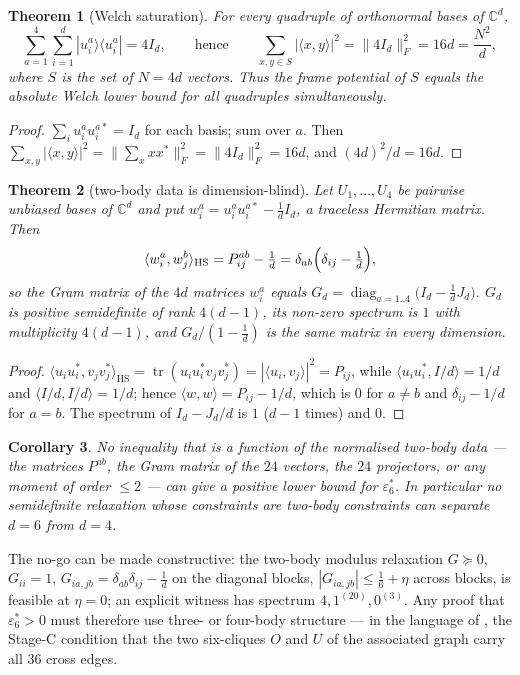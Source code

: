 \documentclass[11pt,a4paper]{article}
\newtheorem{theorem}{Theorem}[section]
\newtheorem{corollary}[theorem]{Corollary}
\theoremstyle{remark}
\newcommand{\C}{\mathbb{C}}
\newcommand{\HS}{\mathrm{HS}}
\newcommand{\eps}{\varepsilon}
\DeclareMathOperator{\tr}{tr}
\begin{document}
\begin{theorem}[Welch saturation]\label{thm:welch}
For \emph{every} quadruple of orthonormal bases of $\C^d$,
\[
\sum_{a=1}^{4}\sum_{i=1}^{d}|u^a_i\rangle\langle u^a_i|=4I_d,
\qquad\text{hence}\qquad
\sum_{x,y\in S}|\langle x,y\rangle|^2=\|4I_d\|_F^2=16d=\frac{N^2}{d},
\]
where $S$ is the set of $N=4d$ vectors.  Thus the frame potential of $S$ equals the absolute
Welch lower bound for all quadruples simultaneously.
\end{theorem}
\begin{proof}
$\sum_i u^a_i u^{a*}_i=I_d$ for each basis; sum over $a$.  Then
$\sum_{x,y}|\langle x,y\rangle|^2=\|\sum_x xx^*\|_F^2=\|4I_d\|_F^2=16d$, and $(4d)^2/d=16d$.
\end{proof}

\begin{theorem}[two-body data is dimension-blind]\label{thm:blind}
Let $U_1,\dots,U_4$ be pairwise unbiased bases of $\C^d$ and put
$w^a_i=u^a_iu^{a*}_i-\tfrac1d I_d$, a traceless Hermitian matrix.  Then
\[
\langle w^a_i,w^b_j\rangle_{\HS}=P^{ab}_{ij}-\tfrac1d
=\delta_{ab}\Bigl(\delta_{ij}-\tfrac1d\Bigr),
\]
so the Gram matrix of the $4d$ matrices $w^a_i$ equals
$G_d=\operatorname{diag}_{a=1..4}\bigl(I_d-\tfrac1dJ_d\bigr)$.  $G_d$ is positive semidefinite
of rank $4(d-1)$, its non-zero spectrum is $1$ with multiplicity $4(d-1)$, and
$G_d/(1-\tfrac1d)$ is the same matrix in every dimension.
\end{theorem}
\begin{proof}
$\langle u_iu_i^*,v_jv_j^*\rangle_{\HS}=\tr(u_iu_i^*v_jv_j^*)=|\langle u_i,v_j\rangle|^2=P_{ij}$,
while $\langle u_iu_i^*,I/d\rangle=1/d$ and $\langle I/d,I/d\rangle=1/d$; hence
$\langle w,w\rangle=P_{ij}-1/d$, which is $0$ for $a\ne b$ and $\delta_{ij}-1/d$ for $a=b$.
The spectrum of $I_d-J_d/d$ is $1$ ($d-1$ times) and $0$.
\end{proof}

\begin{corollary}\label{cor:nogo}
No inequality that is a function of the normalised two-body data --- the matrices $P^{ab}$,
the Gram matrix of the $24$ vectors, the $24$ projectors, or any moment of order $\le2$ ---
can give a positive lower bound for $\eps_6^*$.  In particular no semidefinite relaxation
whose constraints are two-body constraints can separate $d=6$ from $d=4$.
\end{corollary}

The no-go can be made constructive: the two-body modulus relaxation
$G\succeq0$, $G_{ii}=1$, $G_{ia,jb}=\delta_{ab}\delta_{ij}-\tfrac1d$ on the diagonal blocks,
$|G_{ia,jb}|\le\tfrac16+\eta$ across blocks, is feasible at $\eta=0$; an explicit witness has
spectrum $4,1^{(20)},0^{(3)}$.  Any proof that $\eps_6^*>0$ must therefore use three- or
four-body structure --- in the language of \cite{preprint}, the Stage-C condition that the two
six-cliques $O$ and $U$ of the associated graph carry all $36$ cross edges.
\end{document}
